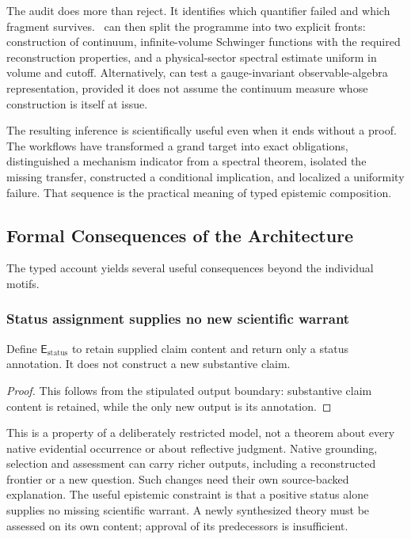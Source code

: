 The audit does more than reject. It identifies which quantifier failed and
which fragment survives.\  can then split
the programme into two explicit fronts: construction of continuum,
infinite-volume Schwinger functions with the required reconstruction
properties, and a physical-sector spectral estimate uniform in volume and
cutoff. Alternatively,  can test a
gauge-invariant observable-algebra representation, provided it does not assume
the continuum measure whose construction is itself at issue.

The resulting inference is scientifically useful even when it ends without a
proof. The workflows have transformed a grand target into exact obligations,
distinguished a mechanism indicator from a spectral theorem, isolated the
missing transfer, constructed a conditional implication, and localized a
uniformity failure. That sequence is the practical meaning of typed epistemic
composition.

\subsection{Formal Consequences of the Architecture}

The typed account yields several useful consequences beyond the individual
motifs.

\subsubsection{Status assignment supplies no new scientific warrant}

\begin{proposition}
Define $\mathsf{E}_{\mathrm{status}}$ to retain supplied claim content and return
only a status annotation. It does not construct a new substantive claim.
\end{proposition}
\begin{proof}
This follows from the stipulated output boundary: substantive claim content
is retained, while the only new output is its annotation.
\end{proof}
This is a property of a deliberately restricted model, not a theorem about every
native evidential occurrence or about reflective judgment. Native grounding,
selection and assessment can carry richer outputs, including a reconstructed
frontier or a new question. Such changes need their own source-backed explanation.
The useful epistemic constraint is that a positive status alone supplies no
missing scientific warrant. A newly synthesized theory must be assessed on its
own content; approval of its predecessors is insufficient.

